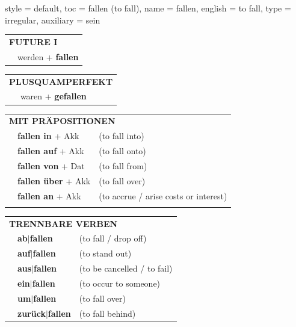 \begin{verbentry}{
  style = {default},
  toc = {fallen (to fall)},
  name = {fallen},
  english = {to fall},
  type = {irregular},
  auxiliary = {sein}
}
\begin{tabular}{rl}
    \multicolumn{2}{l}{\textbf{FUTURE I} }\\
    &werden + \textbf{fallen}\\
 
  \end{tabular}
\hfill
   \begin{tabular}{rl}
      \multicolumn{2}{l}{\textbf{PLUSQUAMPERFEKT}}\\
    &waren + \textbf{gefallen}\\
  \end{tabular}

   \vspace{10pt}

   \begin{tabular}{lll}
      \multicolumn{3}{l}{\textbf{MIT PRÄPOSITIONEN}}\\
& \textbf{fallen in} + Akk & (to fall into)\\
& \textbf{fallen auf} + Akk & (to fall onto)\\
&\textbf{fallen von} + Dat & (to fall from)\\
&\textbf{fallen über} + Akk & (to fall over)\\
&\textbf{fallen an} + Akk & (to accrue / arise costs or interest)\\
\vspace{10pt} 
\end{tabular}
  \hfill
   \begin{tabular}{lll}
      \multicolumn{3}{l}{\textbf{TRENNBARE VERBEN}}\\
 & \textbf{ab$|$fallen} & (to fall / drop off)\\
  & \textbf{auf$|$fallen} & (to stand out)\\
   & \textbf{aus$|$fallen} & (to be cancelled / to fail)\\
   & \textbf{ein$|$fallen} & (to occur to someone)\\
    & \textbf{um$|$fallen} & (to fall over)\\
       & \textbf{zurück$|$fallen} & (to fall behind)\\
  \end{tabular}


  \vspace{-5pt}
\end{verbentry}

